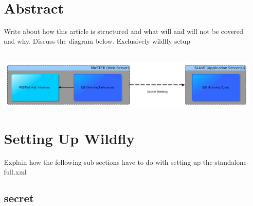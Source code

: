 \documentclass[
10pt, %
letterpaper, %
oneside, %
headinclude,footinclude, %
BCOR5mm, %
]{scrartcl}
\title{\normalfont\spacedallcaps{Remote EJB Setup and Invocation}} %
\author{\spacedlowsmallcaps{Michael Meding* , mikeymeding@gmail.com}} %
\date{} %
\begin{document}
\maketitle %

\setcounter{tocdepth}{2} %

\tableofcontents %

\thispagestyle{empty} %

 
\section*{Abstract}
Write about how this article is structured and what will and will not be covered and why. 
Discuss the diagram below. Exclusively wildfly setup
 
~\newline
\includegraphics[width=13.75cm]{EJBDiagram} %


\section{Setting Up Wildfly}


\paragraph{} Explain how the following sub sections have to do with setting up the standalone-full.xml


\subsection{secret}
\end{document}
